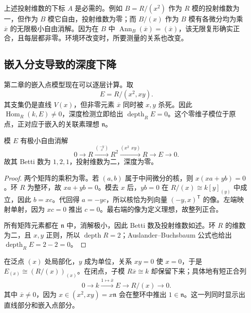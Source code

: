 \ProseParagraphBreak

上述投射维数的下标 \(A\) 是必需的。例如 \(B=R/(x^2)\) 作为 \(R\) 模的投射维数为一，但作为 \(B\) 模它自由，投射维数为零；而 \(B/(x)\) 作为 \(B\) 模有各微分均为乘 \(\overline x\) 的无限极小自由消解。因为在 \(B\) 中 \(\operatorname{Ann}_B(\overline x)=(\overline x)\)，该无限复形确实正合，且每层都非零。环境环改变时，所要测量的关系也改变。

\subsection{嵌入分支导致的深度下降}
\label{g5:subsec:0805:03}

第二章的嵌入点模型现在可以逐层计算。取
\[
	E=R/(x^2,xy).
\]
其支集仍是直线 \(V(x)\)，但非零元素 \(\overline x\) 同时被 \(x,y\) 杀死。因此 \(\operatorname{Hom}_R(k,E)\ne0\)，深度检测立即给出 \(\operatorname{depth}_R E=0\)。这个零维子模位于原点，正对应于嵌入的关联素理想 \(\mathfrak n\)。

\begin{proposition}\label{g5:prop:embedded-point-resolution}
	模 \(E\) 有极小自由消解
	\[
		0\longrightarrow R
		\xrightarrow{\binom{-y}{x}}R^2
		\xrightarrow{(x^2\ \ xy)}R
		\longrightarrow E\longrightarrow0.
	\]
	故其 Betti 数为 \(1,2,1\)，投射维数为二，深度为零。
\end{proposition}
\begin{proof}
	两个矩阵的乘积为零。若 \((a,b)\) 属于中间微分的核，则
	\(x(xa+yb)=0\)。环 \(R\) 为整环，故 \(xa+yb=0\)。模去 \(x\) 后，\(yb=0\) 在 \(R/(x)\cong k[y]_{(y)}\) 中成立，因此 \(b=xc\)。代回得 \(a=-yc\)，所以核恰为列向量 \((-y,x)^{\mathsf T}\) 的像。左端映射单射，因为 \(xc=0\) 推出 \(c=0\)。最右端的像为定义理想，故整列正合。

	所有矩阵元素都在 \(\mathfrak n\) 中，消解极小，因此 Betti 数及投射维数如述。环 \(R\) 的维数为二，且 \(x,y\) 正则，所以 \(\operatorname{depth}R=2\)；Auslander–Buchsbaum 公式也给出 \(\operatorname{depth}_R E=2-2=0\)。
\end{proof}

在泛点 \((x)\) 处局部化，\(y\) 成为单位，关系 \(xy=0\) 使 \(x=0\)，于是 \(E_{(x)}\cong(R/(x))_{(x)}\)。在闭点，子模 \(R\overline x\cong k\) 却保留下来；具体地有短正合列
\[
	0\longrightarrow k\xrightarrow{1\mapsto\overline x}
	E\longrightarrow R/(x)\longrightarrow0.
\]
其中 \(\overline x\ne0\)，因为 \(x\in(x^2,xy)=x\mathfrak n\) 会在整环中推出 \(1\in\mathfrak n\)。这一列同时显示出直线部分和嵌入点部分。

\ProseParagraphBreak

